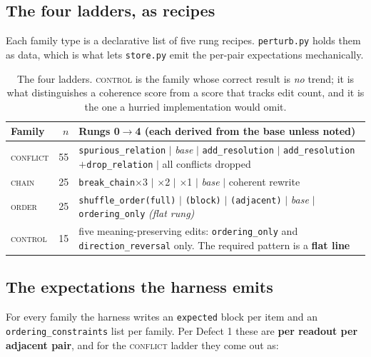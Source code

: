 \documentclass[11pt]{article}
\newcommand{\pymod}[1]{\texttt{#1}}
\begin{document}
\subsection{The four ladders, as recipes}

Each family type is a declarative list of five rung recipes. \pymod{perturb.py} holds them as data,
which is what lets \pymod{store.py} emit the per-pair expectations mechanically.

\begin{table}[h]\centering\small
\renewcommand{\arraystretch}{1.15}
\begin{tabular}{@{}lrp{8.9cm}@{}}
\toprule
\textbf{Family} & \textbf{$n$} & \textbf{Rungs 0$\to$4 (each derived from the base unless noted)}\\
\midrule
\textsc{conflict} & 55 &
  \texttt{spurious\_relation} $|$ \emph{base} $|$ \texttt{add\_resolution} $|$
  \texttt{add\_resolution}$+$\texttt{drop\_relation} $|$ all conflicts dropped\\
\textsc{chain}    & 25 &
  \texttt{break\_chain}$\times$3 $|$ $\times$2 $|$ $\times$1 $|$ \emph{base} $|$ coherent rewrite\\
\textsc{order}    & 25 &
  \texttt{shuffle\_order(full)} $|$ \texttt{(block)} $|$ \texttt{(adjacent)} $|$ \emph{base} $|$
  \texttt{ordering\_only} \emph{(flat rung)}\\
\textsc{control}  & 15 &
  five meaning-preserving edits: \texttt{ordering\_only} and \texttt{direction\_reversal} only.
  The required pattern is a \textbf{flat line}\\
\bottomrule
\end{tabular}
\caption{The four ladders. \textsc{control} is the family whose correct result is \emph{no}
trend; it is what distinguishes a coherence score from a score that tracks edit count, and it is
the one a hurried implementation would omit.}
\label{tab:ladders}
\end{table}

\subsection{The expectations the harness emits}

For every family the harness writes an \texttt{expected} block per item and an
\texttt{ordering\_constraints} list per family. Per Defect 1 these are \textbf{per readout per
adjacent pair}, and for the \textsc{conflict} ladder they come out as:
\end{document}
